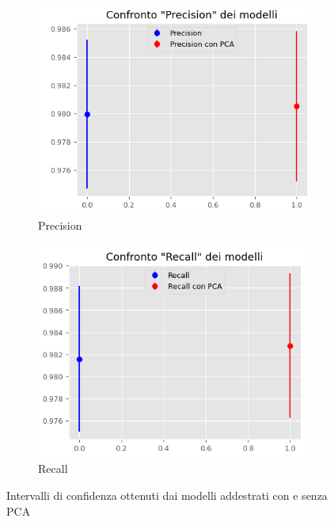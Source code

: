 \begin{figure}[!ht]
\begin{subfigure}[b]{0.4\textwidth}
        \centering
        \includegraphics[width=\textwidth]{img/rete/intervalliPrecision.png}
        \caption{Precision}
        \label{fig:precision}
    \end{subfigure}
    \hfill
    \begin{subfigure}[b]{0.4\textwidth}
        \centering
        \includegraphics[width=\textwidth]{img/rete/intervalliRecall.png}
        \caption{Recall}
        \label{fig:recall}
    \end{subfigure}
    \caption{Intervalli di confidenza ottenuti dai modelli addestrati con e senza PCA}
    \label{fig:intervalli_confidenza_corr}
\end{figure}

